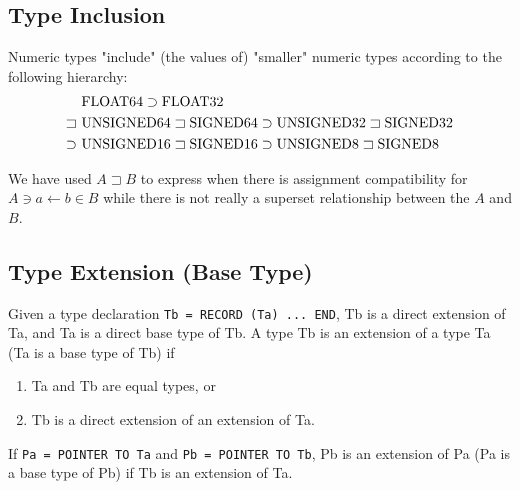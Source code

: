 \documentclass[a4wide,11pt]{article}
\newcommand{\SIGNED}{\lstinline"SIGNED"}
\newcommand{\UNSIGNED}{\lstinline"UNSIGNED"}
\newcommand{\FLOAT}{\lstinline"FLOAT"}
\begin{document}
\subsection{Type Inclusion}
Numeric types "include" (the values of) "smaller" numeric types according to the following hierarchy:
\begin{align*}
	& \FLOAT64 \supset \FLOAT32 \\
	\sqsupset\ & \UNSIGNED64 \sqsupset \SIGNED64
	\supset \UNSIGNED32 \sqsupset \SIGNED32 \\
	\supset\ & \UNSIGNED16 \sqsupset \SIGNED16
	\supset \UNSIGNED8 \sqsupset \SIGNED8
\end{align*}

We have used $A \sqsupset B$ to express when there is assignment compatibility for $A \ni a \leftarrow b \in B$ while there is not really a superset relationship between the $A$ and $B$. 

\subsection{Type Extension (Base Type)}
Given a type declaration \lstinline"Tb = RECORD (Ta) ... END", Tb is a direct extension of Ta, and Ta is a direct base type of Tb. A type Tb is an extension of a type Ta (Ta is a base type of Tb) if
\begin{enumerate}
\item Ta and Tb are equal types, or
\item Tb is a direct extension of an extension of Ta.
\end{enumerate}
If \lstinline"Pa = POINTER TO Ta" and \lstinline"Pb = POINTER TO Tb", Pb is an extension of Pa (Pa is a base type of Pb) if Tb is an extension of Ta.
\end{document}
